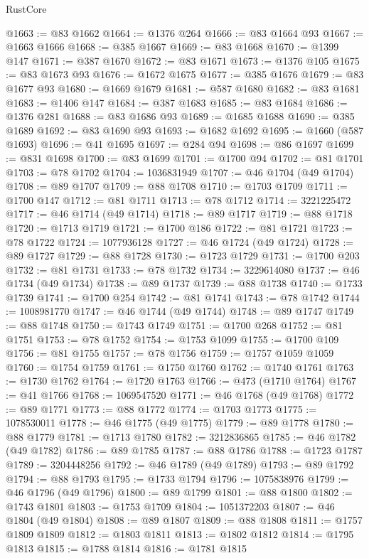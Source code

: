 \begin{lexlean}{RustCore}
\begin{coremodule}
@1663 := @83 @1662
@1664 := @1376 @264
@1666 := @83 @1664 @93
@1667 := @1663 @1666
@1668 := @385 @1667
@1669 := @83 @1668
@1670 := @1399 @147
@1671 := @387 @1670
@1672 := @83 @1671
@1673 := @1376 @105
@1675 := @83 @1673 @93
@1676 := @1672 @1675
@1677 := @385 @1676
@1679 := @83 @1677 @93
@1680 := @1669 @1679
@1681 := @587 @1680
@1682 := @83 @1681
@1683 := @1406 @147
@1684 := @387 @1683
@1685 := @83 @1684
@1686 := @1376 @281
@1688 := @83 @1686 @93
@1689 := @1685 @1688
@1690 := @385 @1689
@1692 := @83 @1690 @93
@1693 := @1682 @1692
@1695 := @1660 (@587 @1693)
@1696 := @41 @1695
@1697 := @284 @94
@1698 := @86 @1697
@1699 := @831 @1698
@1700 := @83 @1699
@1701 := @1700 @94
@1702 := @81 @1701
@1703 := @78 @1702
@1704 := 1036831949
@1707 := @46 @1704 (@49 @1704)
@1708 := @89 @1707
@1709 := @88 @1708
@1710 := @1703 @1709
@1711 := @1700 @147
@1712 := @81 @1711
@1713 := @78 @1712
@1714 := 3221225472
@1717 := @46 @1714 (@49 @1714)
@1718 := @89 @1717
@1719 := @88 @1718
@1720 := @1713 @1719
@1721 := @1700 @186
@1722 := @81 @1721
@1723 := @78 @1722
@1724 := 1077936128
@1727 := @46 @1724 (@49 @1724)
@1728 := @89 @1727
@1729 := @88 @1728
@1730 := @1723 @1729
@1731 := @1700 @203
@1732 := @81 @1731
@1733 := @78 @1732
@1734 := 3229614080
@1737 := @46 @1734 (@49 @1734)
@1738 := @89 @1737
@1739 := @88 @1738
@1740 := @1733 @1739
@1741 := @1700 @254
@1742 := @81 @1741
@1743 := @78 @1742
@1744 := 1008981770
@1747 := @46 @1744 (@49 @1744)
@1748 := @89 @1747
@1749 := @88 @1748
@1750 := @1743 @1749
@1751 := @1700 @268
@1752 := @81 @1751
@1753 := @78 @1752
@1754 := @1753 @1099
@1755 := @1700 @109
@1756 := @81 @1755
@1757 := @78 @1756
@1759 := @1757 @1059 @1059
@1760 := @1754 @1759
@1761 := @1750 @1760
@1762 := @1740 @1761
@1763 := @1730 @1762
@1764 := @1720 @1763
@1766 := @473 (@1710 @1764)
@1767 := @41 @1766
@1768 := 1069547520
@1771 := @46 @1768 (@49 @1768)
@1772 := @89 @1771
@1773 := @88 @1772
@1774 := @1703 @1773
@1775 := 1078530011
@1778 := @46 @1775 (@49 @1775)
@1779 := @89 @1778
@1780 := @88 @1779
@1781 := @1713 @1780
@1782 := 3212836865
@1785 := @46 @1782 (@49 @1782)
@1786 := @89 @1785
@1787 := @88 @1786
@1788 := @1723 @1787
@1789 := 3204448256
@1792 := @46 @1789 (@49 @1789)
@1793 := @89 @1792
@1794 := @88 @1793
@1795 := @1733 @1794
@1796 := 1075838976
@1799 := @46 @1796 (@49 @1796)
@1800 := @89 @1799
@1801 := @88 @1800
@1802 := @1743 @1801
@1803 := @1753 @1709
@1804 := 1051372203
@1807 := @46 @1804 (@49 @1804)
@1808 := @89 @1807
@1809 := @88 @1808
@1811 := @1757 @1809 @1809
@1812 := @1803 @1811
@1813 := @1802 @1812
@1814 := @1795 @1813
@1815 := @1788 @1814
@1816 := @1781 @1815

\end{coremodule}
\end{lexlean}
